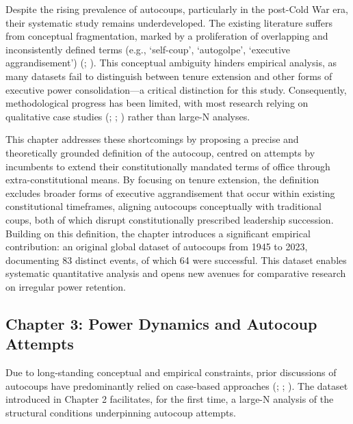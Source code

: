 \documentclass[
  12pt,
]{report}
\begin{document}
Despite the rising prevalence of autocoups, particularly in the
post-Cold War era, their systematic study remains underdeveloped. The
existing literature suffers from conceptual fragmentation, marked by a
proliferation of overlapping and inconsistently defined terms (e.g.,
`self-coup', `autogolpe', `executive aggrandisement')
(;
). This conceptual
ambiguity hinders empirical analysis, as many datasets fail to
distinguish between tenure extension and other forms of executive power
consolidation---a critical distinction for this study. Consequently,
methodological progress has been limited, with most research relying on
qualitative case studies (; ;
)
rather than large-N analyses.

This chapter addresses these shortcomings by proposing a precise and
theoretically grounded definition of the autocoup, centred on attempts
by incumbents to extend their constitutionally mandated terms of office
through extra-constitutional means. By focusing on tenure extension, the
definition excludes broader forms of executive aggrandisement that occur
within existing constitutional timeframes, aligning autocoups
conceptually with traditional coups, both of which disrupt
constitutionally prescribed leadership succession. Building on this
definition, the chapter introduces a significant empirical contribution:
an original global dataset of autocoups from 1945 to 2023, documenting
83 distinct events, of which 64 were successful. This dataset enables
systematic quantitative analysis and opens new avenues for comparative
research on irregular power retention.

\subsection*{Chapter 3: Power Dynamics and Autocoup
Attempts}\label{chapter-3-power-dynamics-and-autocoup-attempts}

Due to long-standing conceptual and empirical constraints, prior
discussions of autocoups have predominantly relied on case-based
approaches (;
;
). The dataset
introduced in Chapter 2 facilitates, for the first time, a large-N
analysis of the structural conditions underpinning autocoup attempts.
\end{document}
